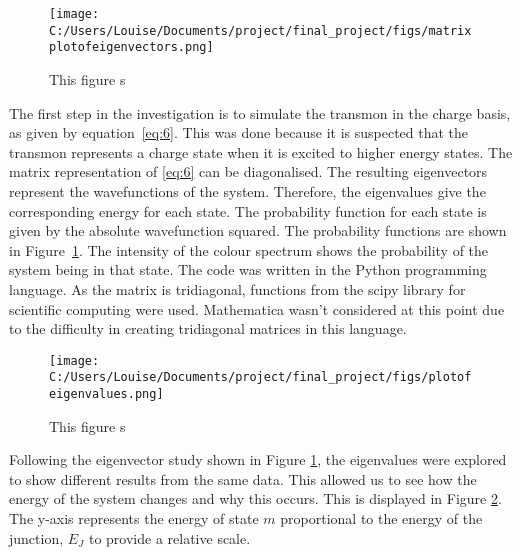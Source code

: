\documentclass[11pt]{article}
\begin{document}
\begin{figure}[!ht]
\centering
\texttt{[image: C:/Users/Louise/Documents/project/final\_project/figs/matrixplotofeigenvectors.png]}
\caption{This figure s}
\label{fig:graph1}
\end{figure}
The first step in the investigation is to simulate the transmon in the charge basis, as given by equation~\ref{eq:6}. This was done because it is suspected that the transmon represents a charge state when it is excited to higher energy states. The matrix representation of \ref{eq:6} can be diagonalised. The resulting eigenvectors represent the wavefunctions of the system. Therefore, the eigenvalues give the corresponding energy for each state. The probability function for each state is given by the absolute wavefunction squared. The probability functions are shown in Figure~\ref{fig:graph1}. The intensity of the colour spectrum shows the probability of the system being in that state. The code was written in the Python programming language. As the matrix is tridiagonal, functions from the scipy library for scientific computing were used. Mathematica wasn't considered at this point due to the difficulty in creating tridiagonal matrices in this language.
\begin{figure}[!ht]
\centering
\texttt{[image: C:/Users/Louise/Documents/project/final\_project/figs/plotofeigenvalues.png]}
\caption{This figure s}
\label{fig:graph2}
\end{figure}
Following the eigenvector study shown in Figure \ref{fig:graph1}, the eigenvalues were explored to show different results from the same data. This allowed us to see how the energy of the system changes and why this occurs. This is displayed in Figure \ref{fig:graph2}. The y-axis represents the energy of state $m$ proportional to the energy of the junction, $E_J$ to provide a relative scale.
\end{document}
